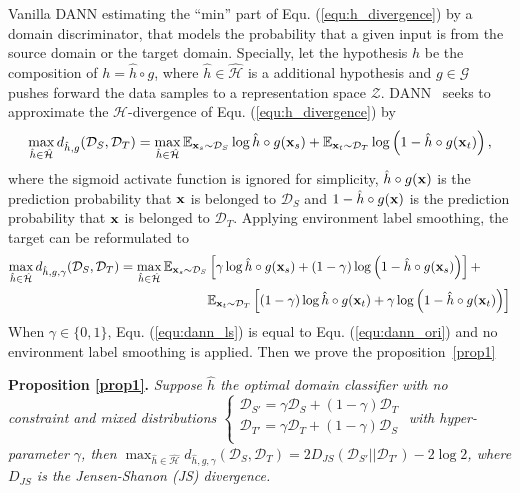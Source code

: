\documentclass{article} \usepackage{iclr2023_conference,times}
\newcommand{\E}{\mathbb{E}}
\newcommand{\myref}[1]{Equ. (\ref{#1})}
\newcommand{\D}{\mathcal{D}}
\begin{document}
Vanilla DANN estimating the ``min'' part of \myref{equ:h_divergence} by a domain discriminator, that models the probability that a given input is from the source domain or the target domain. Specially, let the hypothesis $h$ be the composition of $h=\hat{h}\circ g$, where $\hat{h}\in\hat{\mathcal{H}}$ is a additional hypothesis and $g\in\mathcal{G}$ pushes forward the data samples to a representation space $\mathcal{Z}$. DANN~\citep{2006Analysis} seeks to approximate the $\mathcal{H}$-divergence of \myref{equ:h_divergence} by
\begin{equation}
    \max_{\hat{h}\in\hat{\mathcal{H}}} d_{\hat{h},g}(\D_S,\D_T)=\max_{\hat{h}\in\hat{\mathcal{H}}} \E_{\x_s\sim \D_S}\log \hat{h}\circ g(\x_s)+\E_{\x_t\sim\D_T} \log\left(1-\hat{h}\circ g(\x_t)\right),
    \label{equ:dann_ori}
\end{equation}
where the sigmoid activate function is ignored for simplicity, $\hat{h}\circ g(\mathbf{x})$ is the prediction probability that $\mathbf{x}$ is belonged to $\D_S$ and $1-\hat{h}\circ g(\mathbf{x})$ is the prediction probability that $\mathbf{x}$ is belonged to $\D_T$. Applying environment label smoothing, the target can be reformulated to 
\begin{equation}
\begin{aligned}
\max_{\hat{h}\in\hat{\mathcal{H}}} d_{\hat{h},g,\gamma}(\D_S,\D_T)=\max_{\hat{h}\in\hat{\mathcal{H}}} \E_{\x_s\sim \D_S}&\left[\gamma\log \hat{h}\circ g(\x_s)+(1-\gamma)\log\left(1-\hat{h}\circ g(\x_s)\right) \right] + \\
&\E_{\x_t\sim \D_T}\left[(1-\gamma)\log \hat{h}\circ g(\x_t)+\gamma\log\left(1-\hat{h}\circ g(\x_t)\right) \right]
\end{aligned}\label{equ:dann_ls}
\end{equation}
When $\gamma\in\{0,1\}$, \myref{equ:dann_ls} is equal to \myref{equ:dann_ori} and no environment label smoothing is applied. Then we prove the proposition~\ref{prop1}

\noindent\textbf{Proposition \ref{prop1}.} \textit{Suppose $\hat{h}$ the optimal domain classifier with no constraint and mixed distributions $\left\{         \begin{array}{c} 
    \D_{S'}=\gamma\D_S+(1-\gamma)\D_T\\ 
    \D_{T'}=\gamma\D_T+(1-\gamma)\D_S\\ 
  \end{array}\right.$ with hyper-parameter $\gamma$, then $\max_{\hat{h}\in\hat{\mathcal{H}}} d_{\hat{h},g,\gamma}(\D_S,\D_T)=2D_{JS}(\D_{S'}||\D_{T'})-2\log2$, where $D_{JS}$ is the Jensen-Shanon (JS) divergence.}
\end{document}
